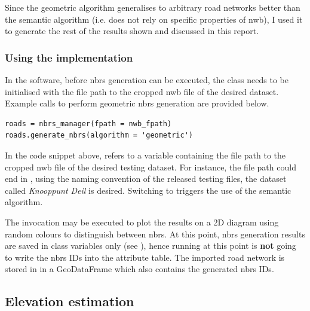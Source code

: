 Since the geometric algorithm generalises to arbitrary road networks better than the semantic algorithm (i.e. does not rely on specific properties of \ac{nwb}), I used it to generate the rest of the results shown and discussed in this report.

\subsubsection{Using the implementation}

In the software, before \ac{nbrs} generation can be executed, the  class needs to be initialised with the file path to the cropped \ac{nwb} file of the desired dataset. Example calls to perform geometric \ac{nbrs} generation are provided below.

\begin{verbatim}
roads = nbrs_manager(fpath = nwb_fpath)
roads.generate_nbrs(algorithm = 'geometric')
\end{verbatim}

In the code snippet above,  refers to a variable containing the file path to the cropped \ac{nwb} file of the desired testing dataset. For instance, the file path could end in , using the naming convention of the released testing files, the dataset called \textit{Knooppunt Deil} is desired. Switching to  triggers the use of the semantic algorithm.

The invocation  may be executed to plot the results on a 2D diagram using random colours to distinguish between \ac{nbrs}. At this point, \ac{nbrs} generation results are saved in class variables only (see ), hence running  at this point is \textbf{not} going to write the \ac{nbrs} IDs into the attribute table. The imported road network is stored in  in a GeoDataFrame which also contains the generated \ac{nbrs} IDs.

\subsection{Elevation estimation}
\label{sub:r_elevationestimation}

